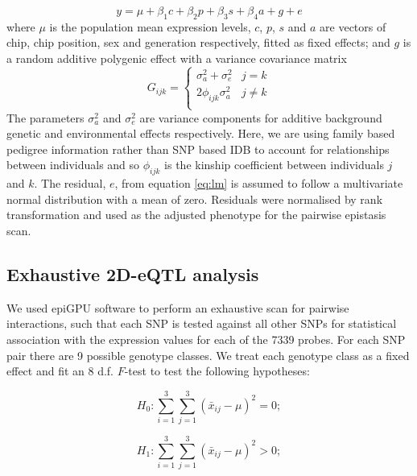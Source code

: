 \documentclass{article}
\begin{document}
\begin{equation}
y = \mu + \beta_{1}c + \beta_{2}p + \beta_{3}s + \beta_{4}a + g + e
\label{eq:lm}
\end{equation}
where $\mu$ is the population mean expression levels, $c$, $p$, $s$ and $a$ are vectors of chip, chip position, sex and generation respectively, fitted as fixed effects; and $g$ is a random additive polygenic effect with a variance covariance matrix 
\begin{equation}
G_{ijk} = \left \{ 
\begin{array}{ll}
\sigma _a ^2 + \sigma _e ^2&        j = k \\ 
2\phi _{ijk} \sigma _a ^2& 			j \neq k \\
\end{array} \right.
\end{equation}
The parameters $\sigma_a^2$ and $\sigma_e^2$ are variance components for additive background genetic and environmental effects respectively. Here, we are using family based pedigree information rather than SNP based IDB to account for relationships between individuals and so $\phi _{ijk}$ is the kinship coefficient between individuals $j$ and $k$. The residual, $e$, from equation \ref{eq:lm} is assumed to follow a multivariate normal distribution with a mean of zero. Residuals were normalised by rank transformation and used as the adjusted phenotype for the pairwise epistasis scan. 


\subsection{Exhaustive 2D-eQTL analysis}

We used epiGPU software to perform an exhaustive scan for pairwise interactions, such that each SNP is tested against all other SNPs for statistical association with the expression values for each of the 7339 probes. For each SNP pair there are 9 possible genotype classes. We treat each genotype class as a fixed effect and fit an 8 d.f. $F$-test to test the following hypotheses:

\begin{equation}
H _0 : \sum _{i=1} ^3 \sum _{j=1} ^3 (\bar x _{ij} - \mu) ^2 = 0; 
\end{equation}

\begin{equation}
H _1 : \sum _{i=1} ^3 \sum _{j=1} ^3 (\bar x _{ij} - \mu) ^2 > 0; 
\label{eq:8df}
\end{equation}
\end{document}
